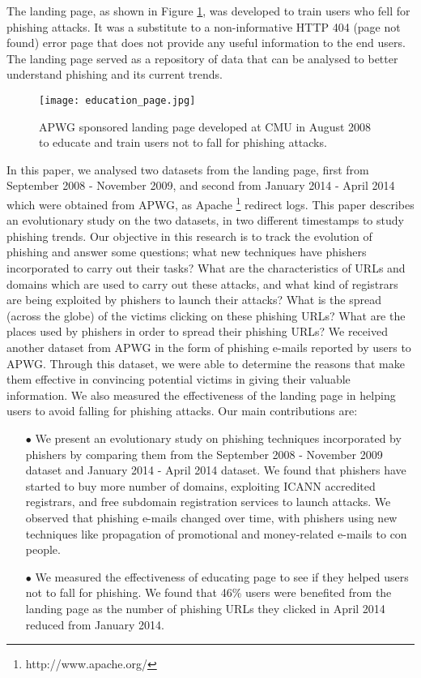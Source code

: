 \documentclass[conference]{IEEEtran}
\begin{document}
The landing page, as shown in Figure \ref{fig:education_page}, was developed to train users who fell for phishing attacks. It was a substitute to a non-informative HTTP 404 (page not found) error page that does not provide any useful information to the end users. The landing page served as a repository of data that can be analysed to better understand phishing and its current trends.
\begin{figure}[h]
\centering
\texttt{[image: education\_page.jpg]}
\caption{APWG sponsored landing page developed at CMU in August 2008 to educate and train users not to fall for phishing attacks.}
\label{fig:education_page}
\end{figure}
\newline\indent
In this paper, we analysed two datasets from the landing page, first from September 2008 - November 2009, and second from January 2014 - April 2014 which were obtained from APWG, as Apache \footnote{http://www.apache.org/} redirect logs. This paper describes an evolutionary study on the two datasets, in two different timestamps to study phishing trends. Our objective in this research is to track the evolution of phishing and answer some questions; what new techniques have phishers incorporated to carry out their tasks? What are the characteristics of URLs and domains which are used to carry out these attacks, and what kind of registrars are being exploited by phishers to launch their attacks? What is the spread (across the globe) of the victims clicking on these phishing URLs? What are the places used by phishers in order to spread their phishing URLs?
\newline\indent
We received another dataset from APWG in the form of phishing e-mails reported by users to APWG. Through this dataset, we were able to determine the reasons that make them effective in convincing potential victims in giving their valuable information. We also measured the effectiveness of the landing page in helping users to avoid falling for phishing attacks. Our main contributions are:
\begin{itemize}
\item[$\bullet$ ] We present an evolutionary study on phishing techniques incorporated by phishers by comparing them from the September 2008 - November 2009 dataset and January 2014 - April 2014 dataset. We found that phishers have started to buy more number of domains, exploiting ICANN accredited registrars, and free subdomain registration services to launch attacks. We observed that phishing e-mails changed over time, with phishers using new techniques like propagation of promotional and money-related e-mails to con people.
\item[$\bullet$] We measured the effectiveness of educating page to see if they helped users not to fall for phishing. We found that 46\% users were benefited from the landing page as the number of phishing URLs they clicked in April 2014 reduced from January 2014.
\end{itemize}
\end{document}

